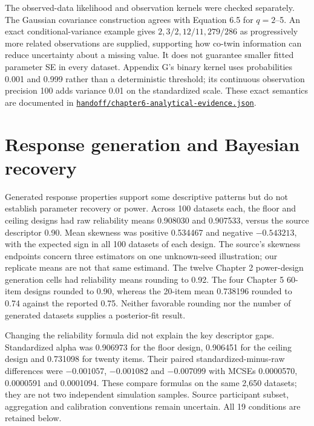 \documentclass[11pt]{article}
\begin{document}
The observed-data likelihood and observation kernels were checked separately. The Gaussian covariance construction agrees with Equation 6.5 for $q=2$--5. An exact conditional-variance example gives $2,3/2,12/11,279/286$ as progressively more related observations are supplied, supporting how co-twin information can reduce uncertainty about a missing value. It does not guarantee smaller fitted parameter SE in every dataset. Appendix G's binary kernel uses probabilities 0.001 and 0.999 rather than a deterministic threshold; its continuous observation precision 100 adds variance 0.01 on the standardized scale. These exact semantics are documented in \href{https://github.com/alectionary/vibe-math/blob/master/formalization/schwabe-psychometric-genetics/handoff/chapter6-analytical-evidence.json}{\nolinkurl{handoff/chapter6-analytical-evidence.json}}.

\section{Response generation and Bayesian recovery}
Generated response properties support some descriptive patterns but do not establish parameter recovery or power. Across 100 datasets each, the floor and ceiling designs had raw reliability means 0.908030 and 0.907533, versus the source descriptor 0.90. Mean skewness was positive 0.534467 and negative $-0.543213$, with the expected sign in all 100 datasets of each design. The source's skewness endpoints concern three estimators on one unknown-seed illustration; our replicate means are not that same estimand. The twelve Chapter 2 power-design generation cells had reliability means rounding to 0.92. The four Chapter 5 60-item designs rounded to 0.90, whereas the 20-item mean 0.738196 rounded to 0.74 against the reported 0.75. Neither favorable rounding nor the number of generated datasets supplies a posterior-fit result.

Changing the reliability formula did not explain the key descriptor gaps. Standardized alpha was 0.906973 for the floor design, 0.906451 for the ceiling design and 0.731098 for twenty items. Their paired standardized-minus-raw differences were $-0.001057$, $-0.001082$ and $-0.007099$ with MCSEs 0.0000570, 0.0000591 and 0.0001094. These compare formulas on the same 2,650 datasets; they are not two independent simulation samples. Source participant subset, aggregation and calibration conventions remain uncertain. All 19 conditions are retained below.
\end{document}
